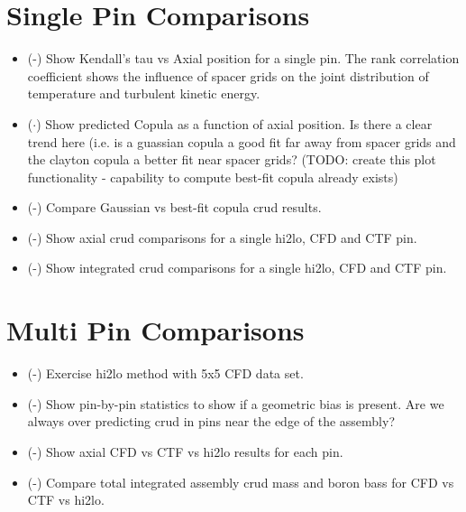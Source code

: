 
\section{Single Pin Comparisons}

\begin{itemize}
    \item (\checkmark-) Show Kendall's tau vs Axial position for a single pin.  The rank correlation coefficient shows
    the influence of spacer grids on the joint distribution of temperature and turbulent kinetic energy.
    \item ($\cdot$) Show predicted Copula as a function of axial position.  Is there a clear trend here (i.e. is a guassian copula
        a good fit far away from spacer grids and the clayton copula a better fit near spacer grids?  (TODO: create this plot functionality - capability to compute best-fit copula already exists)
    \item (\checkmark-) Compare Gaussian vs best-fit copula crud results.
    \item (\checkmark-) Show axial crud comparisons for a single hi2lo, CFD and CTF pin.
    \item (\checkmark-) Show integrated crud comparisons for a single hi2lo, CFD and CTF pin.
\end{itemize}

\section{Multi Pin Comparisons}

\begin{itemize}
    \item (\checkmark-) Exercise hi2lo method with 5x5 CFD data set.
    \item (\checkmark-) Show pin-by-pin statistics to show if a geometric bias is present.  Are we always over predicting crud
    in pins near the edge of the assembly?
    \item (\checkmark-) Show axial CFD vs CTF vs hi2lo results for each pin.
    \item (\checkmark-) Compare total integrated assembly crud mass and boron bass for CFD vs CTF vs hi2lo.
\end{itemize}
